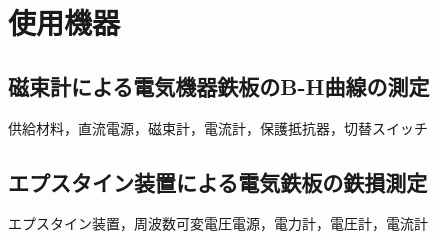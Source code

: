 \section{使用機器}
\subsection{磁束計による電気機器鉄板のB-H曲線の測定}
供給材料，直流電源，磁束計，電流計，保護抵抗器，切替スイッチ

\subsection{エプスタイン装置による電気鉄板の鉄損測定}
エプスタイン装置，周波数可変電圧電源，電力計，電圧計，電流計


